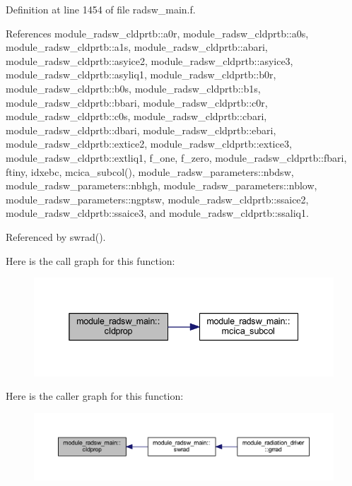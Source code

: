 Definition at line 1454 of file radsw\+\_\+main.\+f.



References module\+\_\+radsw\+\_\+cldprtb\+::a0r, module\+\_\+radsw\+\_\+cldprtb\+::a0s, module\+\_\+radsw\+\_\+cldprtb\+::a1s, module\+\_\+radsw\+\_\+cldprtb\+::abari, module\+\_\+radsw\+\_\+cldprtb\+::asyice2, module\+\_\+radsw\+\_\+cldprtb\+::asyice3, module\+\_\+radsw\+\_\+cldprtb\+::asyliq1, module\+\_\+radsw\+\_\+cldprtb\+::b0r, module\+\_\+radsw\+\_\+cldprtb\+::b0s, module\+\_\+radsw\+\_\+cldprtb\+::b1s, module\+\_\+radsw\+\_\+cldprtb\+::bbari, module\+\_\+radsw\+\_\+cldprtb\+::c0r, module\+\_\+radsw\+\_\+cldprtb\+::c0s, module\+\_\+radsw\+\_\+cldprtb\+::cbari, module\+\_\+radsw\+\_\+cldprtb\+::dbari, module\+\_\+radsw\+\_\+cldprtb\+::ebari, module\+\_\+radsw\+\_\+cldprtb\+::extice2, module\+\_\+radsw\+\_\+cldprtb\+::extice3, module\+\_\+radsw\+\_\+cldprtb\+::extliq1, f\+\_\+one, f\+\_\+zero, module\+\_\+radsw\+\_\+cldprtb\+::fbari, ftiny, idxebc, mcica\+\_\+subcol(), module\+\_\+radsw\+\_\+parameters\+::nbdsw, module\+\_\+radsw\+\_\+parameters\+::nbhgh, module\+\_\+radsw\+\_\+parameters\+::nblow, module\+\_\+radsw\+\_\+parameters\+::ngptsw, module\+\_\+radsw\+\_\+cldprtb\+::ssaice2, module\+\_\+radsw\+\_\+cldprtb\+::ssaice3, and module\+\_\+radsw\+\_\+cldprtb\+::ssaliq1.



Referenced by swrad().



Here is the call graph for this function\+:\nopagebreak
\begin{figure}[H]
\begin{center}
\leavevmode
\includegraphics[width=338pt]{group__module__radsw__main_ga1a3bb4385e7a610aa7eec9759383ffe9_cgraph}
\end{center}
\end{figure}




Here is the caller graph for this function\+:
\nopagebreak
\begin{figure}[H]
\begin{center}
\leavevmode
\includegraphics[width=350pt]{group__module__radsw__main_ga1a3bb4385e7a610aa7eec9759383ffe9_icgraph}
\end{center}
\end{figure}


